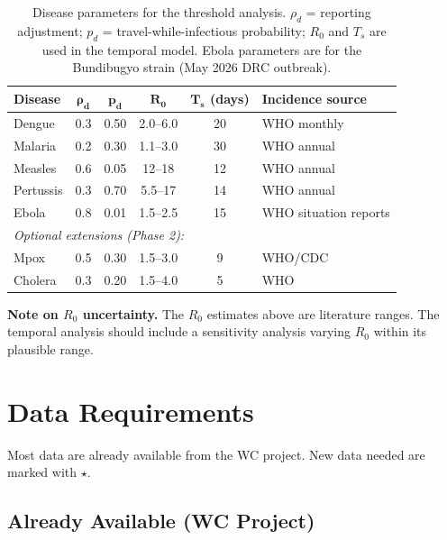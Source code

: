 \documentclass[12pt]{article}
\begin{document}
\begin{table}[h!]
\centering
\caption{Disease parameters for the threshold analysis.
$\rho_d$ = reporting adjustment; $p_d$ = travel-while-infectious
probability; $R_0$ and $T_s$ are used in the temporal model.
Ebola parameters are for the Bundibugyo strain (May 2026 DRC outbreak).}
\label{tab:params}
\begin{tabular}{lccccl}
\toprule
\textbf{Disease} & $\boldsymbol{\rho_d}$ & $\boldsymbol{p_d}$
  & $\boldsymbol{R_0}$ & $\boldsymbol{T_s}$ (days)
  & \textbf{Incidence source} \\
\midrule
Dengue    & 0.3 & 0.50 & 2.0--6.0 & 20 & WHO monthly \\
Malaria   & 0.2 & 0.30 & 1.1--3.0 & 30 & WHO annual \\
Measles   & 0.6 & 0.05 & 12--18   & 12 & WHO annual \\
Pertussis & 0.3 & 0.70 & 5.5--17  & 14 & WHO annual \\
Ebola     & 0.8 & 0.01 & 1.5--2.5 & 15 & WHO situation reports \\
\midrule
\multicolumn{6}{l}{\textit{Optional extensions (Phase 2):}} \\
Mpox      & 0.5 & 0.30 & 1.5--3.0 & 9  & WHO/CDC \\
Cholera   & 0.3 & 0.20 & 1.5--4.0 & 5  & WHO \\
\bottomrule
\end{tabular}
\end{table}

\textbf{Note on $R_0$ uncertainty.} The $R_0$ estimates above are
literature ranges. The temporal analysis should include a sensitivity
analysis varying $R_0$ within its plausible range.

\section{Data Requirements}

Most data are already available from the WC project. New data
needed are marked with $\star$.

\subsection{Already Available (WC Project)}
\end{document}
